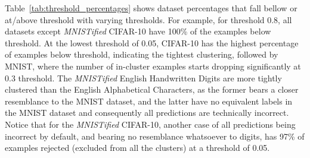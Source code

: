 
Table~\ref{tab:threshold_percentages} shows dataset percentages that fall bellow or at/above threshold with varying thresholds. For example, for threshold 0.8, all datasets except \textit{MNISTified} CIFAR-10 have 100\% of the examples below threshold. At the lowest threshold of 0.05, CIFAR-10 has the highest percentage of examples below threshold, indicating the tightest clustering, followed by MNIST, where the number of in-cluster examples starts dropping significantly at 0.3 threshold. The \textit{MNISTified} English Handwritten Digits are more tightly clustered than the English Alphabetical Characters, as the former bears a closer resemblance to the MNIST dataset, and the latter have no equivalent labels in the MNIST dataset and consequently all predictions are technically incorrect. Notice that for the \textit{MNISTified} CIFAR-10, another case of all predictions being incorrect by default, and bearing no resemblance whatsoever to digits, has 97\% of examples rejected (excluded from all the clusters) at a threshold of 0.05. %

